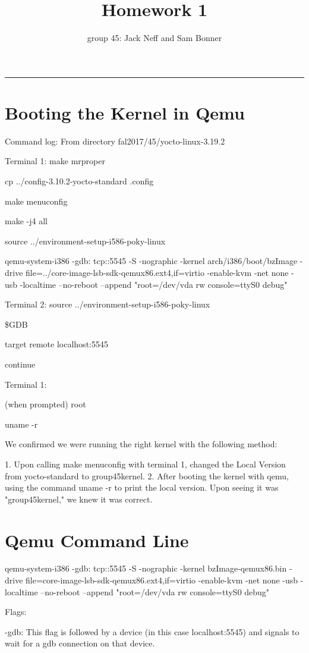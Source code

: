 \documentclass[letterpaper,10pt,fleqn]{article}
\title{Homework 1}
\author{group 45: Jack Neff and Sam Bonner}
\begin{document}
\maketitle
\hrule

\section*{Booting the Kernel in Qemu}

Command log:
From directory fal2017/45/yocto-linux-3.19.2

Terminal 1: 
make mrproper

cp ../config-3.10.2-yocto-standard .config

make menuconfig

make -j4 all

source ../environment-setup-i586-poky-linux

qemu-system-i386 -gdb: tcp::5545 -S -nographic -kernel arch/i386/boot/bzImage -drive file=../core-image-lsb-sdk-qemux86.ext4,if=virtio -enable-kvm -net none -usb -localtime --no-reboot --append "root=/dev/vda rw console=ttyS0 debug"

Terminal 2: 
source ../environment-setup-i586-poky-linux

\$GDB

target remote localhost:5545

continue

Terminal 1: 

(when prompted) root

uname -r

We confirmed we were running the right kernel with the following method:

1. Upon calling make menuconfig with terminal 1, changed the Local Version from yocto-standard to group45kernel. 
2. After booting the kernel with qemu, using the command uname -r to print the local version. Upon seeing it was "group45kernel," we knew it was correct. 

\section{Qemu Command Line}
qemu-system-i386 -gdb: tcp::5545 -S -nographic -kernel bzImage-qemux86.bin -drive file=core-image-lsb-sdk-qemux86.ext4,if=virtio -enable-kvm -net none -usb -localtime --no-reboot --append "root=/dev/vda rw console=ttyS0 debug"


Flags: 

-gdb: This flag is followed by a device (in this case localhost:5545) and signals to wait for a gdb connection on that device. 
\end{document}
